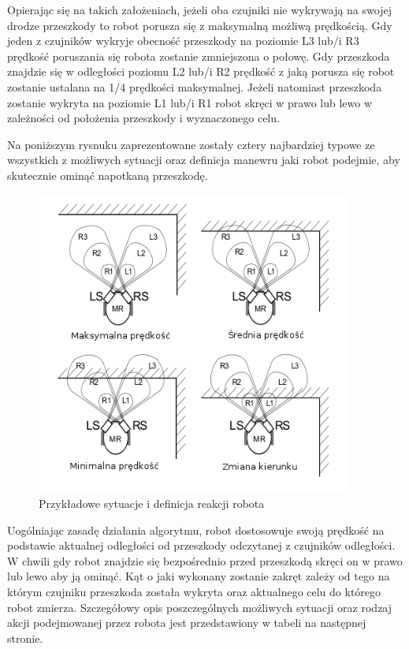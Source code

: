 Opierając się na takich założeniach, jeżeli oba czujniki nie
wykrywają na swojej drodze przeszkody to robot porusza się z maksymalną możliwą
prędkością. Gdy jeden z czujników wykryje obecność przeszkody na poziomie  L3
lub/i R3 prędkość poruszania się robota zostanie zmniejszona o połowę. Gdy
przeszkoda znajdzie się w odległości poziomu L2 lub/i R2 prędkość z jaką porusza
się robot zostanie ustalana na 1/4 prędkości maksymalnej. Jeżeli natomiast
przeszkoda zostanie wykryta na poziomie L1 lub/i R1 robot skręci w prawo lub lewo
w zależności od położenia przeszkody i wyznaczonego celu.

Na poniższym rysnuku zaprezentowane zostały cztery najbardziej typowe ze
wszystkich z możliwych sytuacji oraz definicja manewru jaki robot
podejmie, aby skutecznie ominąć napotkaną przeszkodę. 

\begin{figure}[hb]
 \centering
 \includegraphics[height=100mm]{../images/ch04/obs_avoid_algorithm.png}
 \caption{Przykładowe sytuacje i definicja reakcji robota}
 \label{fig:IRSensorPosition}
\end{figure}

Uogólniając zasadę działania algorytmu, robot dostosowuje swoją prędkość na
podstawie aktualnej odległości od przeszkody odczytanej z czujników odległości.
W chwili gdy robot znajdzie się bezpośrednio przed przeszkodą skręci on w prawo
lub lewo aby ją ominąć. Kąt o jaki wykonany zostanie zakręt zależy od tego na
którym czujniku przeszkoda została wykryta oraz aktualnego celu do którego robot
zmierza. Szczegółowy opis poszczególnych możliwych sytuacji oraz rodzaj akcji
podejmowanej przez robota jest przedstawiony w tabeli na następnej stronie. 

